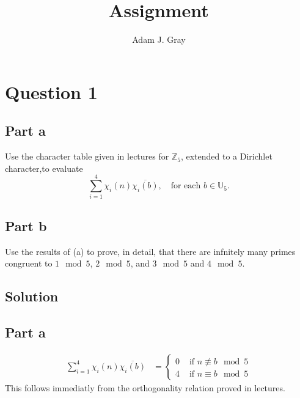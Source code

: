 \documentclass{unswmaths}
\begin{document}
\author{Adam J. Gray}
\subject{Number Theory}
\title{Assignment}

\unswtitle

\section*{Question 1}
\subsection*{Part a}
Use the character table given in lectures for $ \mathbb{Z}_5 $, extended to a Dirichlet character,to evaluate
$$
	\sum_{i=1}^4 \chi_i(n) \overline{ \chi_i(b)}, \ \ \ \text{ for each } b \in \mathbb{U}_5.
$$
\subsection*{Part b}
Use the results of (a) to prove, in detail, that there are infnitely many primes congruent to  $ 1 \mod 5 $,
$ 2 \mod 5 $, and $ 3 \mod 5 $ and $ 4 \mod 5 $.

\subsection*{Solution}
\subsection*{Part a}
\begin{align*}
	\sum_{i=1}^4 \chi_i(n) \overline{ \chi_i(b)} &=
	\begin{cases}
		0 & \text{ if } n \not\equiv b \mod 5 \\
		4 & \text{ if } n \equiv b \mod 5
	\end{cases}
\end{align*}
This follows immediatly from the orthogonality relation proved in lectures.
\end{document}
